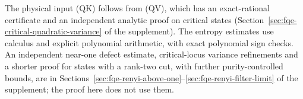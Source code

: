 The physical input (QK) follows from (QV), which has an exact-rational
certificate and an independent analytic proof on critical states (Section~\ref{sec:fqe-critical-quadratic-variance} of the
supplement). The entropy estimates use calculus and explicit polynomial arithmetic, with exact polynomial sign checks.
An independent near-one defect estimate, critical-locus variance refinements and a shorter proof for states with a
rank-two cut, with further purity-controlled bounds, are in Sections~\ref{sec:fqe-renyi-above-one}--\ref{sec:fqe-renyi-filter-limit} of the supplement; the proof here does not use them.









